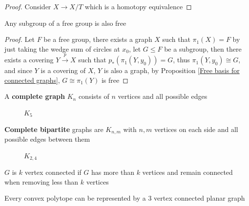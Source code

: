 \documentclass[main]{subfiles}
\begin{document}
\begin{proof}
Consider $X\to X/T$ which is a homotopy equivalence
\end{proof}

\begin{theorem}
Any subgroup of a free group is also free
\end{theorem}

\begin{proof}
Let $F$ be a free group, there exists a graph $X$ such that $\pi_1(X)=F$ by just taking the wedge sum of circles at $x_0$, let $G\leq F$ be a subgroup, then there exists a covering $Y\xrightarrow{p}X$ such that $p_*(\pi_1(Y,y_0))=G$, thus $\pi_1(Y,y_0)\cong G$, and since $Y$ is a covering of $X$, $Y$ is also a graph, by Proposition \ref{Free basis for connected graphs}, $G\cong\pi_1(Y)$ is free
\end{proof}

\begin{definition}
A \textbf{complete graph} $K_n$ consists of $n$ vertices and all possible edges
\begin{figure}[h!]
\centering
{}
\caption{$K_5$}\label{K5 complete graph}
\end{figure}
\textbf{Complete bipartite} graphs are $K_{n,m}$ with $n,m$ vertices on each side and all possible edges between them
\begin{figure}[h!]
\centering
{}
\caption{$K_{2,4}$}\label{K2,4 complete bipartite graph}
\end{figure}
\end{definition}

\begin{definition}
$G$ is $k$ vertex connected if $G$ has more than $k$ vertices and remain connected when removing less than $k$ vertices
\end{definition}

\begin{proposition}
Every convex polytope can be represented by a $3$ vertex connected planar graph
\end{proposition}
\end{document}
